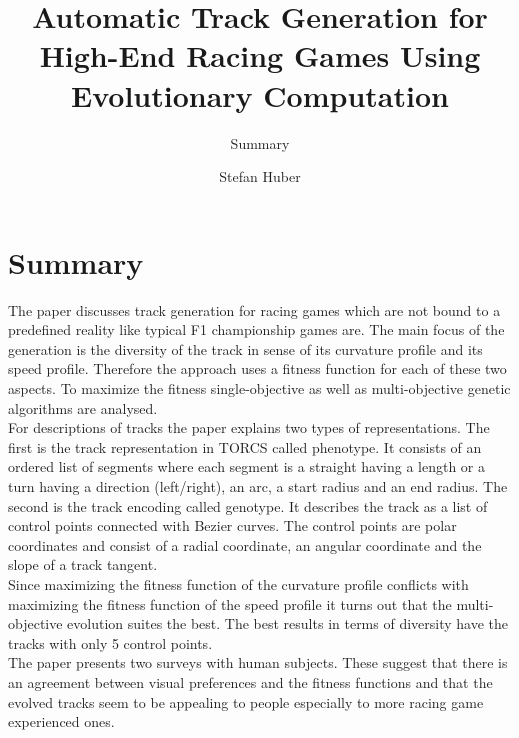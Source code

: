 \documentclass[oneside, notitlepage, twocolumn]{scrartcl}
\title{\LARGE Automatic Track Generation for High-End Racing Games Using Evolutionary Computation}
\subtitle{Summary}
\author{Stefan Huber}
\begin{document}
\maketitle

\section{Summary}
The paper discusses track generation for racing games which are not bound to a predefined reality like typical F1 championship games are.
The main focus of the generation is the diversity of the track in sense of its curvature profile and its speed profile.
Therefore the approach uses a fitness function for each of these two aspects.
To maximize the fitness single-objective as well as multi-objective genetic algorithms are analysed.\\
For descriptions of tracks the paper explains two types of representations.
The first is the track representation in TORCS called phenotype.
It consists of an ordered list of segments where each segment is a straight having a length or a turn having a direction (left/right), an arc, a start radius and an end radius.
The second is the track encoding called genotype.
It describes the track as a list of control points connected with Bezier curves.
The control points are polar coordinates and consist of a radial coordinate, an angular coordinate and the slope of a track tangent.\\
Since maximizing the fitness function of the curvature profile conflicts with maximizing the fitness function of the speed profile it turns out that the multi-objective evolution suites the best.
The best results in terms of diversity have the tracks with only 5 control points.\\
The paper presents two surveys with human subjects.
These suggest that there is an agreement between visual preferences and the fitness functions and that the evolved tracks seem to be appealing to people especially to more racing game experienced ones.
\end{document}
